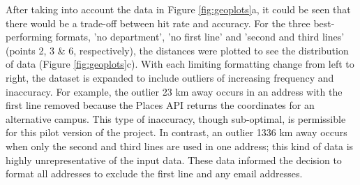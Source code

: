 \documentclass[Report.tex]{subfiles}
\begin{document}
\noindent After taking into account the data in Figure \ref{fig:geoplots}a, it could be seen that there would be a trade-off between hit rate and accuracy. For the three best-performing formats, 'no department', 'no first line' and 'second and third lines' (points 2, 3 \& 6, respectively), the distances were plotted to see the distribution of data (Figure \ref{fig:geoplots}c). With each limiting formatting change from left to right, the dataset is expanded to include outliers of increasing frequency and inaccuracy. For example, the outlier 23 km away occurs in an address with the first line removed because the Places API returns the coordinates for an alternative campus. This type of inaccuracy, though sub-optimal, is permissible for this pilot version of the project. In contrast, an outlier 1336 km away occurs when only the second and third lines are used in one address; this kind of data is highly unrepresentative of the input data. These data informed the decision to format all addresses to exclude the first line and any email addresses.
\end{document}
